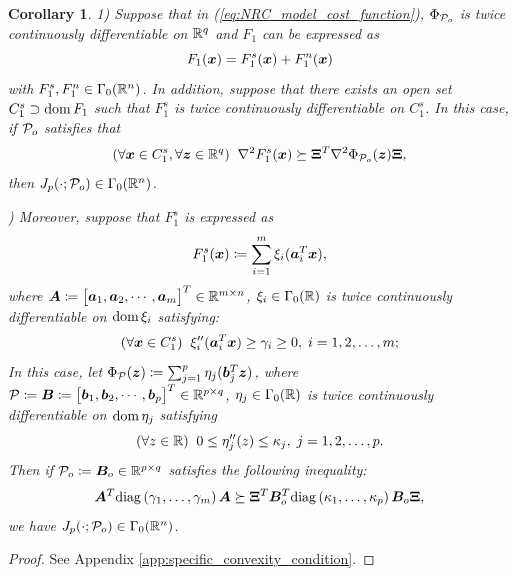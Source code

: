 \documentclass[lettersize,journal]{IEEEtran}
\theoremstyle{plain}%
\newtheorem{corollary}{Corollary}
\theoremstyle{definition}
\theoremstyle{remark}
\begin{document}
\begin{corollary}\label{corol:convexity_condition}
1) Suppose that in (\ref{eq:NRC_model_cost_function}), $\Phi_{\mathcal{P}_o}$ is twice continuously differentiable on $\mathbb{R}^q$ and $F_1$ can be expressed as
\begin{equation}\label{eq:decomposition_of_F1}
F_1(\bm{x})=F_{1}^s(\bm{x})+F_{1}^n(\bm{x})
\end{equation}
with $F_{1}^s,F_{1}^n\in\Gamma_0(\mathbb{R}^n)$. In addition, suppose that there exists an open set $C_1^s\supset \textrm{dom\,}{F_1}$ such that $F_{1}^s$ is twice continuously differentiable on $C_1^s$. In this case, if $\mathcal{P}_o$ satisfies that
\begin{equation*}
(\forall \bm{x}\in C_1^s, \forall \bm{z}\in\mathbb{R}^q)\;\;\nabla^2F_{1}^s(\bm{x})\succeq \bm{\Xi}^T \nabla^2 \Phi_{\mathcal{P}_o}(\bm{z})\bm{\Xi},
\end{equation*}
then $J_{p}(\cdot;\mathcal{P}_o)\in\Gamma_0(\mathbb{R}^n)$.

) Moreover, suppose that $F_1^s$ is expressed as
\begin{align*}
F_1^s(\bm{x})\coloneqq \sum_{i=1}^m \xi_i(\bm{a}_i^T\bm{x}),
\end{align*}
where $\bm{A}\coloneqq\begin{bmatrix}\bm{a}_1,\bm{a}_2,\cdots,\bm{a}_m\end{bmatrix}^T\in\mathbb{R}^{m\times n}$, $\xi_i\in\Gamma_0(\mathbb{R})$ is twice continuously differentiable on $\textrm{dom\,}{\xi_i}$ satisfying:
\begin{equation*}
(\forall \bm{x}\in C_1^s)\;\; \xi_i''(\bm{a}_i^T\bm{x})\geq \gamma_i\geq 0,\; i=1,2,\dots,m;
\end{equation*}
In this case, let $\Phi_{\mathcal{P}}(\bm{z})\coloneqq \sum_{j=1}^p\eta_j(\bm{b}_j^T\bm{z})$, where $\mathcal{P}\coloneqq \bm{B}\coloneqq \begin{bmatrix}\bm{b}_1,\bm{b}_2,\cdots,\bm{b}_p\end{bmatrix}^T\in\mathbb{R}^{p\times q}$, $\eta_j\in\Gamma_0(\mathbb{R})$ is twice continuously differentiable on $\textrm{dom\,}{\eta_j}$ satisfying
\begin{equation*}
(\forall z\in \mathbb{R})\;\; 0\leq\eta''_j(z)\leq \kappa_j,\; j=1,2,\dots,p.
\end{equation*}
Then if $\mathcal{P}_o\coloneqq \bm{B}_o\in\mathbb{R}^{p\times q}$ satisfies the following inequality:
\begin{equation*}
\bm{A}^T\mathrm{diag}\left( \gamma_1,\dots,\gamma_m \right )\bm{A} \succeq \bm{\Xi}^T\bm{B}_o^T\mathrm{diag}\left( \kappa_1,\dots,\kappa_p \right )\bm{B}_o\bm{\Xi},
\end{equation*}
we have $J_{p}(\cdot;\mathcal{P}_o)\in\Gamma_0(\mathbb{R}^n)$.
\end{corollary} 
\begin{proof}
See Appendix \ref{app:specific_convexity_condition}.
\end{proof}
\end{document}

